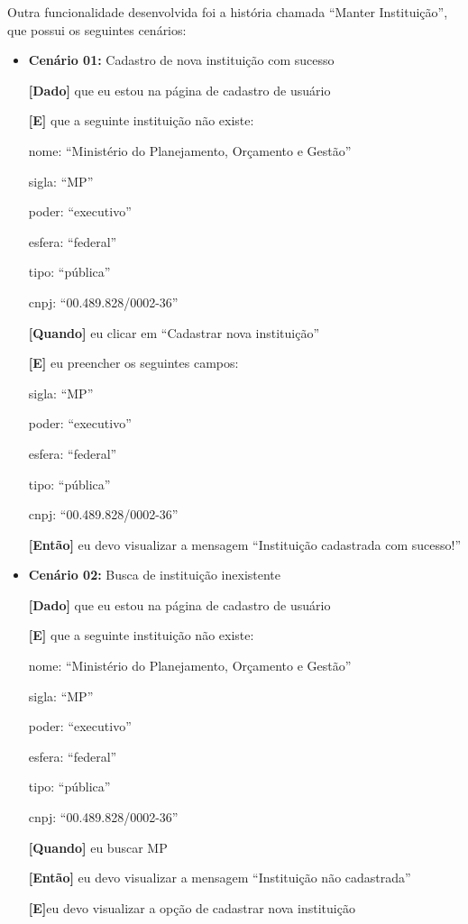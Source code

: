 Outra funcionalidade desenvolvida foi a história chamada ``Manter Instituição'', que possui os seguintes cenários:
\begin{itemize}
\item\textbf{Cenário 01:} Cadastro de nova instituição com sucesso

\textbf{[Dado]} que eu estou na página de cadastro de usuário

\textbf{[E]} que a seguinte instituição não existe:

  	\subitem nome: ``Ministério do Planejamento, Orçamento e Gestão''

  	\subitem sigla: ``MP''

 	\subitem poder: ``executivo''

 	\subitem esfera: ``federal''

  	\subitem tipo: ``pública''

  	\subitem cnpj: ``00.489.828/0002-36''

\textbf{[Quando]} eu clicar em ``Cadastrar nova instituição''

\textbf{[E]} eu preencher os seguintes campos:

  	\subitem sigla: ``MP''

  	\subitem poder: ``executivo''

  	\subitem esfera: ``federal''

  	\subitem tipo: ``pública''

  	\subitem cnpj: ``00.489.828/0002-36''

\textbf{[Então]} eu devo visualizar a mensagem ``Instituição cadastrada com sucesso!''

\item\textbf{Cenário 02:} Busca de instituição inexistente

\textbf{[Dado]} que eu estou na página de cadastro de usuário

\textbf{[E]} que a seguinte instituição não existe:

 \subitem nome: ``Ministério do Planejamento, Orçamento e Gestão''

  \subitem sigla: ``MP''

  \subitem poder: ``executivo''

  \subitem esfera: ``federal''

  \subitem tipo: ``pública''
  
  \subitem cnpj: ``00.489.828/0002-36''

\textbf{[Quando]} eu buscar MP

\textbf{[Então]} eu devo visualizar a mensagem ``Instituição não cadastrada''

\textbf{[E]}eu devo visualizar a opção de cadastrar nova instituição
\end{itemize}

